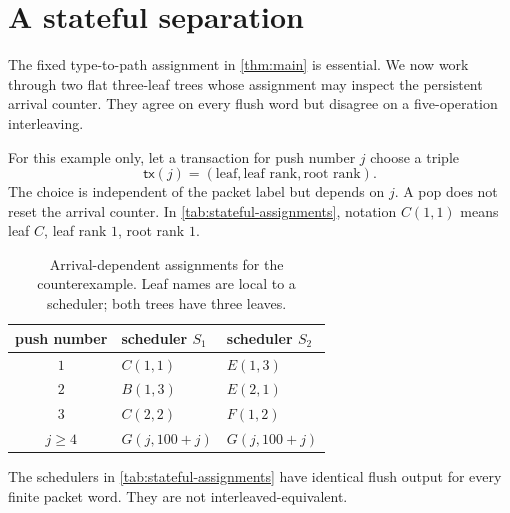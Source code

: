 \section{A stateful separation}
\label{sec:stateful}

The fixed type-to-path assignment in \autoref{thm:main} is essential.  We now
work through two flat three-leaf trees whose assignment may inspect the
persistent arrival counter.  They agree on every flush word but disagree on a
five-operation interleaving.

For this example only, let a transaction for push number \(j\) choose a triple
\[
  \mathsf{tx}(j)=(\text{leaf},\text{leaf rank},\text{root rank}).
\]
The choice is independent of the packet label but depends on \(j\).  A pop does
not reset the arrival counter.  In \autoref{tab:stateful-assignments}, notation
\(C(1,1)\) means leaf \(C\), leaf rank \(1\), root rank \(1\).

\begin{table}[H]
\centering
\begin{tabular}{@{}c@{\qquad}l@{\qquad}l@{}}
\toprule
push number & scheduler \(S_1\) & scheduler \(S_2\)\\
\midrule
\(1\) & \(C(1,1)\) & \(E(1,3)\)\\
\(2\) & \(B(1,3)\) & \(E(2,1)\)\\
\(3\) & \(C(2,2)\) & \(F(1,2)\)\\
\(j\ge4\) & \(G(j,100+j)\) & \(G(j,100+j)\)\\
\bottomrule
\end{tabular}
\caption{Arrival-dependent assignments for the counterexample.  Leaf names
are local to a scheduler; both trees have three leaves.}
\label{tab:stateful-assignments}
\end{table}

\begin{proposition}
\label{prop:stateful-separation}
The schedulers in \autoref{tab:stateful-assignments} have identical flush output
for every finite packet word.  They are not interleaved-equivalent.
\end{proposition}

